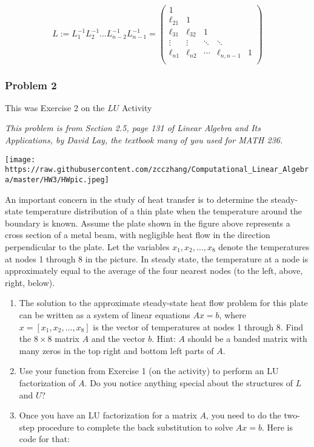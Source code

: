 \documentclass[]{article}
\begin{document}
\[L:= L_{1}^{-1} L_{2}^{-1} \ldots L_{n-2}^{-1} L_{n-1}^{-1} = \begin{pmatrix} 1 & & & & \\
\ell_{21} & 1 & & & \\
\ell_{31} & \ell_{32} & 1 & &  \\
\vdots & \vdots & \ddots & \ddots & \\
\ell_{n1} & \ell_{n2} & \cdots & \ell_{n,n-1} & 1    \\
\end{pmatrix}
\]

\hypertarget{problem-2}{%
\subsubsection{Problem 2}\label{problem-2}}

This was Exercise 2 on the \(LU\) Activity

\emph{This problem is from Section 2.5, page 131 of Linear Algebra and
Its Applications, by David Lay, the textbook many of you used for MATH
236.}

\texttt{[image: https://raw.githubusercontent.com/zcczhang/Computational\_Linear\_Algebra/master/HW3/HWpic.jpeg]}

An important concern in the study of heat transfer is to determine the
steady-state temperature distribution of a thin plate when the
temperature around the boundary is known. Assume the plate shown in the
figure above represents a cross section of a metal beam, with negligible
heat flow in the direction perpendicular to the plate. Let the variables
\(x_1, x_2, \ldots, x_8\) denote the temperatures at nodes 1 through 8
in the picture. In steady state, the temperature at a node is
approximately equal to the average of the four nearest nodes (to the
left, above, right, below).

\begin{enumerate}
\def\labelenumi{\alph{enumi})}
\item
  The solution to the approximate steady-state heat flow problem for
  this plate can be written as a system of linear equations \(Ax=b\),
  where \(x=[x_1, x_2, \ldots, x_8]\) is the vector of temperatures at
  nodes 1 through 8. Find the \(8 \times 8\) matrix \(A\) and the vector
  \(b\). Hint: \(A\) should be a banded matrix with many zeros in the
  top right and bottom left parts of \(A\).
\item
  Use your function from Exercise 1 (on the activity) to perform an LU
  factorization of \(A\). Do you notice anything special about the
  structures of \(L\) and \(U\)?
\item
  Once you have an LU factorization for a matrix \(A\), you need to do
  the two-step procedure to complete the back substitution to solve
  \(Ax=b\). Here is code for that:
\end{enumerate}
\end{document}
